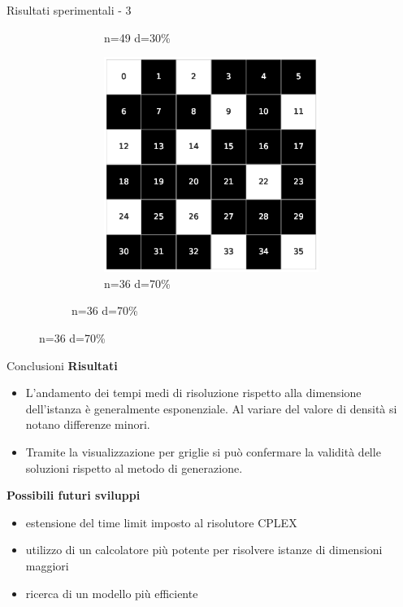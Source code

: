 \documentclass[a4paper]{beamer}
\begin{document}
\begin{frame}{Risultati sperimentali - 3}
\begin{figure}[h!]
\begin{subfigure}[b]{\textwidth}
\begin{subfigure}[b]{0.25\textwidth}
			\caption{n=49 d=30\%}
        \end{subfigure}
        \hspace{1em}
        \begin{subfigure}[b]{0.25\textwidth}
            \includegraphics[width=\columnwidth]{images/Tai36c_6x6_70.eps}
			\caption{n=36 d=70\%}
        \end{subfigure}
     \end{subfigure}
\end{figure}
\end{frame}

\begin{frame}{Conclusioni}
\textbf{Risultati}\\
\begin{itemize}
\item L'andamento dei tempi medi di risoluzione rispetto alla dimensione dell'istanza è generalmente esponenziale. \newline Al variare del valore di densità si notano differenze minori.
\item Tramite la visualizzazione per griglie si può confermare la validità delle soluzioni rispetto al metodo di generazione.
\end{itemize}
\vfill
\textbf{Possibili futuri sviluppi}\\
\begin{itemize}
\item estensione del time limit imposto al risolutore CPLEX 
\item utilizzo di un calcolatore più potente per risolvere istanze di dimensioni maggiori
\item ricerca di un modello più efficiente
\end{itemize}
\end{frame}
\end{document}
